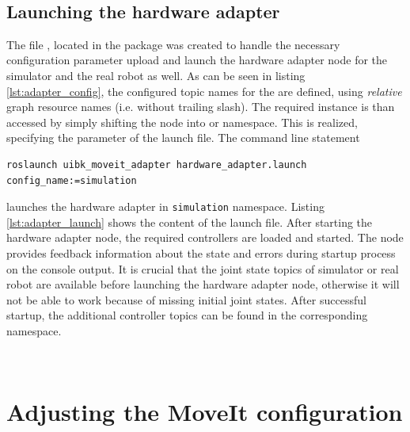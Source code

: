 \begin{minipage}{\linewidth}

\end{minipage} \\

\subsection{Launching the hardware adapter}
\label{sec:launch_moveit}

The file , located in the  package was created to handle the necessary configuration parameter upload and launch the hardware adapter node for the simulator and the real robot as well. As can be seen in listing \ref{lst:adapter_config}, the configured topic names for the  are defined, using \emph{relative} graph resource names (i.e. without trailing slash). The required instance is than accessed by simply shifting the node into  or  namespace. This is realized, specifying the  parameter of the launch file. The command line statement
\begin{verbatim}
roslaunch uibk_moveit_adapter hardware_adapter.launch config_name:=simulation
\end{verbatim}
launches the hardware adapter in \texttt{simulation} namespace. Listing \ref{lst:adapter_launch} shows the content of the launch file. After starting the hardware adapter node, the required controllers are loaded and started. The node provides feedback information about the state and errors during startup process on the console output. It is crucial that the joint state topics of simulator or real robot are available before launching the hardware adapter node, otherwise it will not be able to work because of missing initial joint states. After successful startup, the additional controller topics can be found in the corresponding namespace.

\begin{minipage}{\linewidth}

\end{minipage} \\

\section{Adjusting the MoveIt configuration}

